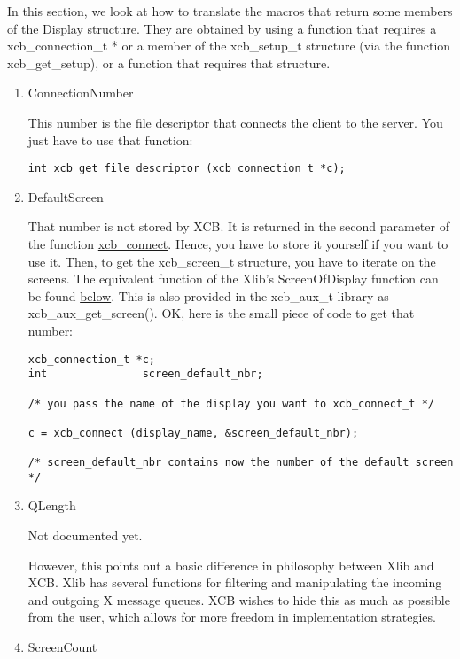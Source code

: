 \documentclass[12pt,oneside,titlepage]{book}
\begin{document}
\begin{enumerate}
\begin{enumerate}
    In this section, we look at how to translate the macros that return
    some members of the {Display} structure. They are obtained by using
    a function that requires a {xcb\_connection\_t *} or a member of the
    {xcb\_setup\_t} structure (via the function {xcb\_get\_setup}), or a
    function that requires that structure.

    \begin{enumerate}
    \item
      \protect\hypertarget{ConnectionNumber}{}{ConnectionNumber}

      This number is the file descriptor that connects the client to the
      server. You just have to use that function:

\begin{verbatim}
int xcb_get_file_descriptor (xcb_connection_t *c);
\end{verbatim}
    \item
      \protect\hypertarget{DefaultScreen}{}{}DefaultScreen

      That number is not stored by XCB. It is returned in the second
      parameter of the function
      {\protect\hyperlink{openconn}{xcb\_connect}}. Hence, you have to
      store it yourself if you want to use it. Then, to get the
      {xcb\_screen\_t} structure, you have to iterate on the screens.
      The equivalent function of the Xlib's {ScreenOfDisplay} function
      can be found \protect\hyperlink{ScreenOfDisplay}{below}. This is
      also provided in the xcb\_aux\_t library as
      {xcb\_aux\_get\_screen()}. OK, here is the small piece of code to
      get that number:

\begin{verbatim}
xcb_connection_t *c;
int               screen_default_nbr;

/* you pass the name of the display you want to xcb_connect_t */

c = xcb_connect (display_name, &screen_default_nbr);

/* screen_default_nbr contains now the number of the default screen */
\end{verbatim}
    \item
      \protect\hypertarget{QLength}{}{}QLength

      Not documented yet.

      However, this points out a basic difference in philosophy between
      Xlib and XCB. Xlib has several functions for filtering and
      manipulating the incoming and outgoing X message queues. XCB
      wishes to hide this as much as possible from the user, which
      allows for more freedom in implementation strategies.
    \item
      \protect\hypertarget{ScreenCount}{}{}ScreenCount


\end{enumerate}
\end{enumerate}
\end{enumerate}
\end{document}
